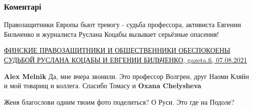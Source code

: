  
 
 
 
 
\subsubsection{Коментарі}
\label{sec:08_08_2021.fb.bilchenko_evgenia.2.kiev.cmt}

\begin{itemize}
 

Правозащитники Европы бьют тревогу - судьба профессора, активиста Евгении
Бильченко и журналиста Руслана Коцабы вызывает серьёзные опасения!

\href{https://gazeta.fi/imeyu-pravo/finskie-pravozashhitniki-i-obshhestvenniki-obespokoeny-sudboj-ruslana-koczaby-i-evgenii-bilchenko/}{%
ФИНСКИЕ ПРАВОЗАЩИТНИКИ И ОБЩЕСТВЕННИКИ ОБЕСПОКОЕНЫ СУДЬБОЙ РУСЛАНА КОЦАБЫ И ЕВГЕНИИ БИЛЬЧЕНКО, %
gazeta.fi, 07.08.2021%
}

\begin{itemize}
 
\textbf{Alex Melnik} Да, мне вчера звонили. Это профессор Волгрен, друг Наоми
Кляйн и мой товарищ и коллега. Спасибо Томасу и \textbf{Oxana Chelysheva}
\end{itemize}

 
Женя благослови одним твоим фото поделиться? О Руси. Это где на Подоле?

\begin{itemize}
 

\end{itemize}
\end{itemize}
